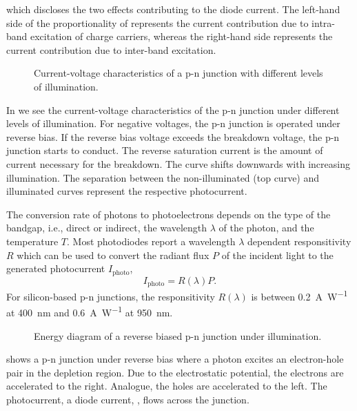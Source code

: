 which discloses the two effects contributing to the diode current.
The left-hand side of the proportionality of  represents the current contribution due to intra-band excitation of charge carriers, whereas the right-hand side represents the current contribution due to inter-band excitation.
\begin{figure}[H]
	\centering
	
	\caption{Current-voltage characteristics of a p-n junction with different levels of illumination.}\label{fig:pn_junction_iv}
\end{figure}
In  we see the current-voltage characteristics of the p-n junction under different levels of illumination.
For negative voltages, the p-n junction is operated under reverse bias.
If the reverse bias voltage exceeds the breakdown voltage, the p-n junction starts to conduct.
The reverse saturation current is the amount of current necessary for the breakdown. The curve shifts downwards with increasing illumination.
The separation between the non-illuminated (top curve) and illuminated curves represent the respective photocurrent.

The conversion rate of photons to photoelectrons depends on the type of the bandgap, i.e., direct or indirect, the wavelength $\lambda$ of the photon, and the temperature $T$.
Most photodiodes report a wavelength $\lambda$ dependent responsitivity $R$ which can be used to convert the radiant flux $P$ of the incident light to the generated photocurrent $I_\text{photo}$,
\begin{equation}
	I_\text{photo}=R(\lambda)P
	\label{eq:responsitivity}.
\end{equation}
For silicon-based p-n junctions, the responsitivity $R(\lambda)$ is between \SI{0.2}{\ampere\per\watt} at \SI{400}{\nano\meter} and \SI{0.6}{\ampere\per\watt} at \SI{950}{\nano\meter}.

\begin{figure}[H]
	\centering
	
	\caption{Energy diagram of a reverse biased p-n junction under illumination.}\label{fig:pn_junction_illumination}
\end{figure}
 shows a p-n junction under reverse bias where a photon excites an electron-hole pair in the depletion region.
Due to the electrostatic potential, the electrons are accelerated to the right. Analogue, the holes are accelerated to the left. The photocurrent, a diode current, , flows across the junction.

